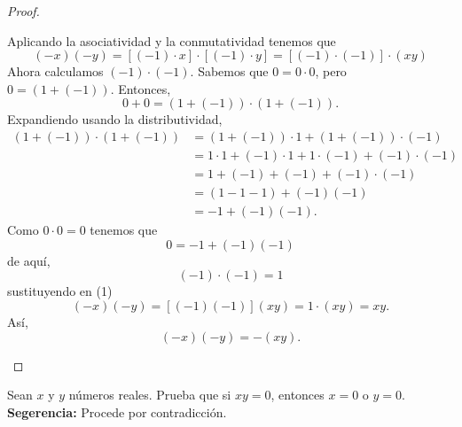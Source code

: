 \documentclass[12pt,a4paper]{article}
\begin{document}
\begin{proof}
\begin{enumerate}
\begin{equation*}
            \end{equation*}
            Aplicando la asociatividad y la conmutatividad tenemos que
            \begin{equation}
                (-x)(-y)=[(-1)\cdot x]\cdot[(-1)\cdot y]=[(-1)\cdot(-1)]\cdot(xy)
            \end{equation}
            Ahora calculamos $(-1)\cdot(-1)$. Sabemos que $0=0\cdot0$, pero $0=(1+(-1))$. Entonces,
            \begin{equation*}
                0+0=(1+(-1))\cdot(1+(-1)).
            \end{equation*}
            Expandiendo usando la distributividad,
            \begin{align*}
                (1+(-1))\cdot(1+(-1))&=(1+(-1))\cdot1+(1+(-1))\cdot(-1)\\
                &=1\cdot1+(-1)\cdot1+1\cdot(-1)+(-1)\cdot(-1)\\
                &=1+(-1)+(-1)+(-1)\cdot(-1)\\
                &=(1-1-1)+(-1)(-1)\\
                &=-1+(-1)(-1).
            \end{align*}
            Como $0\cdot0=0$ tenemos que
            \begin{equation*}
                0=-1+(-1)(-1)
            \end{equation*}
            de aquí,
            \begin{equation*}
                (-1)\cdot(-1)=1
            \end{equation*}
            sustituyendo en (1)
            \begin{equation*}
                (-x)(-y)=[(-1)(-1)](xy)=1\cdot(xy)=xy.
            \end{equation*}
            Así,
            \begin{equation*}
                (-x)(-y)=-(xy).
            \end{equation*}
        \end{enumerate}
    \end{proof}

    \begin{problema}
        Sean $x$ y $y$ números reales. Prueba que si $xy=0$, entonces $x=0$ o $y=0$. \textbf{Segerencia:} Procede por contradicción.
    \end{problema}
\end{document}
